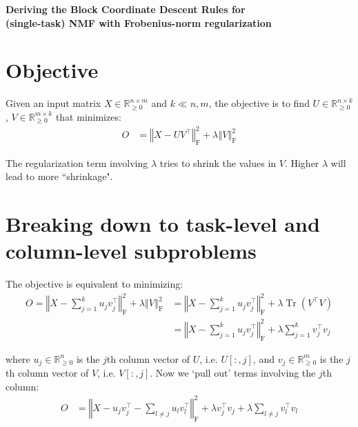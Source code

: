 \documentclass{article}
\DeclareMathOperator{\Tr}{Tr}
\begin{document}
\begin{center}
\textbf{\large{Deriving the Block Coordinate Descent Rules for\\(single-task) NMF with Frobenius-norm regularization}}
\end{center}
\smallskip
\section*{Objective}
Given an input matrix $X \in \mathbb{R}_{\geq 0}^{n \times m}$ and $k \ll n,m$, the objective is to find $U \in \mathbb{R}_{\geq 0}^{n \times k}$, $V \in \mathbb{R}_{\geq 0}^{m \times k}$ that minimizes:
\begin{align}
O &= 
\left\Vert X - U V^\top \right\Vert_\text{F}^2 
+  \lambda \left\Vert V \right\Vert_\text{F}^2
\end{align} 

The regularization term involving $\lambda$ tries to shrink the values in $V$. Higher $\lambda$ will lead to more ``shrinkage".

\medskip
\section*{Breaking down to task-level and column-level subproblems}

The objective is equivalent to minimizing:
\begin{align}
O = 
\left\Vert X - \sum_{j=1}^k u_{j} v^{\top}_{j} \right\Vert_\text{F}^2 
+ \lambda \left\Vert V \right\Vert_\text{F}^2 
&= 
\left\Vert X - \sum_{j=1}^k u_{j} v^{\top}_{j} \right\Vert_\text{F}^2 
+ \lambda \Tr \left( V^\top V \right) \\
&= 
\left\Vert X - \sum_{j=1}^k u_{j} v^{\top}_{j} \right\Vert_\text{F}^2 
+ \lambda \sum_{j=1}^k v_j^\top v_j
\end{align}

where $u_{j} \in \mathbb{R}^{n}_{\geq 0}$ is the $j$th column vector of $U$, i.e. $U[:,j]$, and  $v_{j}  \in \mathbb{R}^m_{\geq 0}$ is the $j$th column vector of $V$, i.e. $V [:,j]$. Now we `pull out' terms involving the $j$th column:
\begin{align}
O &= 
\left\Vert X -u_{j} v^{\top}_{j} - \sum_{l \neq j} u_{l} v^{\top}_{l} \right\Vert_\text{F}^2 
+\lambda v_j^\top v_j
+\lambda \sum_{l\neq j} v_l^\top v_l
\end{align}
\end{document}
